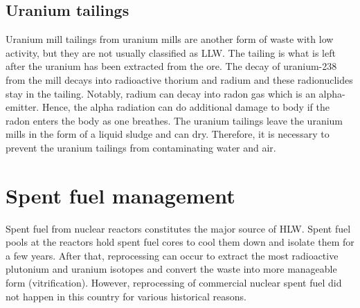 \documentclass[nofootinbib,preprint,aps]{revtex4-1}
\begin{document}
    \subsection{Uranium tailings}
    Uranium mill tailings from uranium mills are another form of waste with low activity, but
    they are not usually classified as LLW. The tailing is what is left after the uranium has been
    extracted from the ore. The decay of uranium-238 from the mill decays into
    radioactive thorium and radium and these radionuclides stay in the tailing. Notably, radium
    can decay into radon gas which is an alpha-emitter. Hence, the alpha radiation can do additional
    damage to body if the radon enters the body as one breathes.
    The uranium tailings leave the uranium mills in the form of a liquid sludge
    and can dry. Therefore, it is necessary to prevent the uranium tailings
    from contaminating water and air.
    
    \section{Spent fuel management}
    \label{sec:temp}
    Spent fuel from nuclear reactors constitutes the major source of HLW. Spent fuel pools at the
    reactors hold spent fuel cores to cool them down and isolate them for a few years. After that,
    reprocessing can occur to extract the most radioactive plutonium and uranium isotopes and
    convert the waste into more manageable form (vitrification). However, reprocessing of commercial
    nuclear spent fuel did not
    happen in this country for various historical reasons. 
\end{document}
